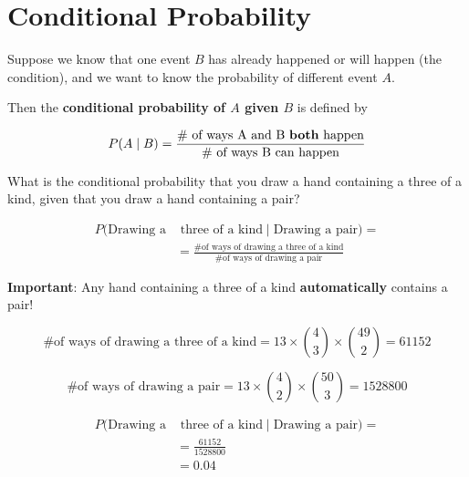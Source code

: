 \section{Conditional Probability}

%
\begin{frame}

Suppose we know that one event $B$ has already happened or will happen (the
condition), and we want to know the probability of different event $A$.

\hfill

Then the \textbf{conditional probability of $A$ given $B$} is defined by

$$ P(A \mid B) = \frac{\text{\# of ways A and B \textbf{both} happen}}{\text{\#
of ways B can happen}} $$

\end{frame}
%

%
\begin{frame}

What is the conditional probability that you draw a hand containing a three of a
kind, given that you draw a hand containing a pair?

\begin{align*}
P(\text{Drawing a} & \text{ three of a kind} \mid \text{Drawing a pair}) = \\ 
&= \frac{\text{\# of ways of drawing a three of a kind}}{\text{\# of ways of
drawing a pair}}
\end{align*}

\textbf{Important}: Any hand containing a three of a kind \textbf{automatically}
contains a pair!

\end{frame}
%

%
\begin{frame}

$$ \text{\# of ways of drawing a three of a kind} = 13 \times {{4}\choose{3}}
\times {{49}\choose{2}} = 61152 $$

$$ \text{\# of ways of drawing a pair} = 13 \times {{4}\choose{2}}
\times {{50}\choose{3}} = 1528800 $$

\end{frame}
%

%
\begin{frame}

\begin{align*}
P(\text{Drawing a} & \text{ three of a kind} \mid \text{Drawing a pair}) = \\ 
&= \frac{61152}{1528800} \\
&= 0.04
\end{align*}

\end{frame}
%

